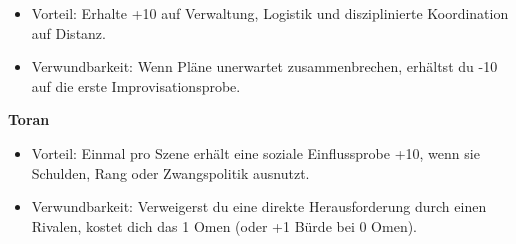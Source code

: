 \begin{itemize}[leftmargin=*,nosep]
\item Vorteil: Erhalte +10 auf Verwaltung, Logistik und disziplinierte Koordination auf Distanz.
\item Verwundbarkeit: Wenn Pläne unerwartet zusammenbrechen, erhältst du -10 auf die erste Improvisationsprobe.
\end{itemize}
\noindent\textbf{Toran}\par
\begin{itemize}[leftmargin=*,nosep]
\item Vorteil: Einmal pro Szene erhält eine soziale Einflussprobe +10, wenn sie Schulden, Rang oder Zwangspolitik ausnutzt.
\item Verwundbarkeit: Verweigerst du eine direkte Herausforderung durch einen Rivalen, kostet dich das 1 Omen (oder +1 Bürde bei 0 Omen).
\end{itemize}



